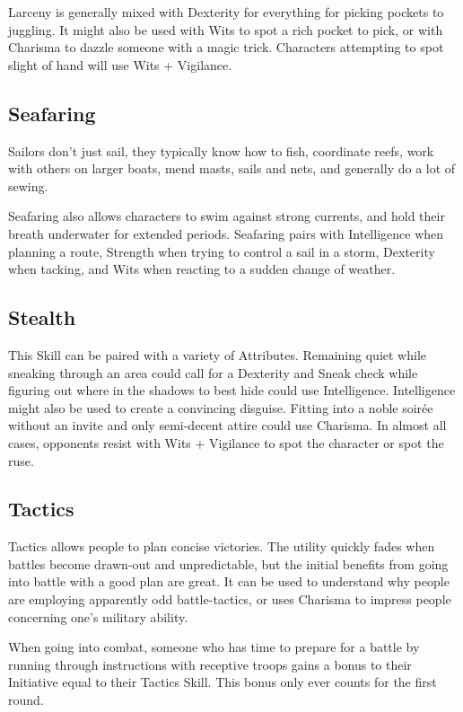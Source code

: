 \begin{multicols}{2}
Larceny is generally mixed with Dexterity for everything for picking pockets to juggling.
It might also be used with Wits to spot a rich pocket to pick, or with Charisma to dazzle someone with a magic trick.
Characters attempting to spot slight of hand will use Wits + Vigilance.

\subsection{Seafaring}

Sailors don't just sail, they typically know how to fish, coordinate reefs, work with others on larger boats, mend masts, sails and nets, and generally do a lot of sewing.

Seafaring also allows characters to swim against strong currents, and hold their breath underwater for extended periods.
Seafaring pairs with Intelligence when planning a route, Strength when trying to control a sail in a storm, Dexterity when tacking, and Wits when reacting to a sudden change of weather.

\subsection{Stealth}

This Skill can be paired with a variety of Attributes.
Remaining quiet while sneaking through an area could call for a Dexterity and Sneak check while figuring out where in the shadows to best hide could use Intelligence.
Intelligence might also be used to create a convincing disguise.
Fitting into a noble soir\'{e}e without an invite and only semi-decent attire could use Charisma.
In almost all cases, opponents resist with Wits + Vigilance to spot the character or spot the ruse.

\subsection{Tactics}

Tactics allows people to plan concise victories.
The utility quickly fades when battles become drawn-out and unpredictable, but the initial benefits from going into battle with a good plan are great.
It can be used to understand why people are employing apparently odd battle-tactics, or uses Charisma to impress people concerning one's military ability.

When going into combat, someone who has time to prepare for a battle by running through instructions with receptive troops gains a bonus to their Initiative equal to their Tactics Skill. This bonus only ever counts for the first \gls{round}.


\end{multicols}
